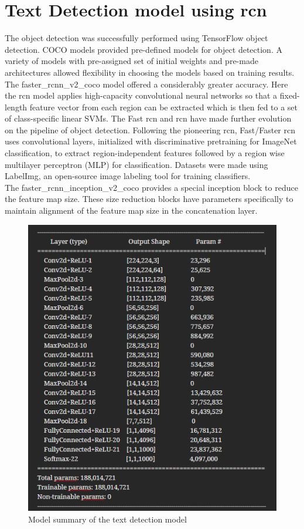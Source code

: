 \section{Text Detection model using \acrlong{rcn}}
The object detection was successfully performed using TensorFlow object detection. COCO models provided pre-defined models for object detection. A variety of models with pre-assigned set of initial weights and pre-made architectures allowed flexibility in choosing the models based on training results. The faster{\_}rcnn{\_}v2{\_}coco model \cite{bhat2018cost} offered a considerably greater accuracy. Here the \acrshort{rcn} \cite{8627998} model applies high-capacity convolutional neural networks so that a fixed-length feature vector from each region can be extracted which is then fed to a set of class-specific linear SVMs. The Fast \acrshort{rcn} and \acrlong{rcn} \cite{wang2017scene} have made further evolution on the pipeline of object detection. Following the pioneering \acrshort{rcn}, Fast/Faster \acrshort{rcn} uses convolutional layers, initialized with discriminative pretraining for ImageNet classification, to extract region-independent features followed by a region wise multilayer perceptron (MLP) for classification. Datasets were made using LabelImg, an open-source image labeling tool for training classifiers. \\
The faster{\_}rcnn{\_}inception{\_}v2{\_}coco provides a special inception block to reduce the feature map size. These size reduction blocks have parameters specifically to maintain alignment of the feature map size in the concatenation layer.\\
\begin{figure}[H]
\centering
	\includegraphics[scale=0.7]{Figures/object_summ.png}	
	\caption{Model summary of the text detection model}
	\label{fig:object_summ}
\end{figure}


